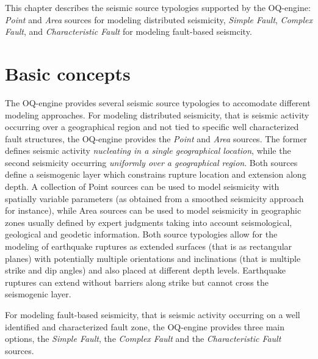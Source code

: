 This chapter describes the seismic source typologies supported by the OQ-engine:
\textit{Point} and \textit{Area} sources for modeling distributed seismicity,
\textit{Simple Fault}, \textit{Complex Fault}, and \textit{Characteristic Fault}
for modeling fault-based seismcity.

\section{Basic concepts}
The OQ-engine provides several seismic source typologies to accomodate different
modeling approaches. For modeling distributed seismicity, that is seismic
activity occurring over a geographical region and not tied to specific well
characterized fault structures, the OQ-engine provides the \textit{Point} and
\textit{Area} sources. The former defines seismic activity \textit{nucleating in
a single geographical location}, while the second seismicity occurring
\textit{uniformly over a geographical region}. 
% 
Both sources define a seismogenic layer which constrains rupture location and
extension along depth. A collection of Point sources can be used to model
seismicity with spatially variable parameters (as obtained from a smoothed
seismicity approach for instance), while Area sources can be used to model
seismicity in geographic zones usually defined by expert judgments taking into
account seismological, geological and geodetic information. 
%
Both source typologies allow for the modeling of earthquake ruptures as extended
surfaces (that is as rectangular planes) with potentially multiple orientations
and inclinations (that is multiple strike and dip angles) and also placed at
different depth levels. Earthquake ruptures can extend without barriers along
strike but cannot cross the seismogenic layer.

For modeling fault-based seismicity, that is seismic activity occurring on a
well identified and characterized fault zone, the OQ-engine provides three 
main options, the \textit{Simple Fault}, the \textit{Complex Fault} and
the \textit{Characteristic Fault} sources.

